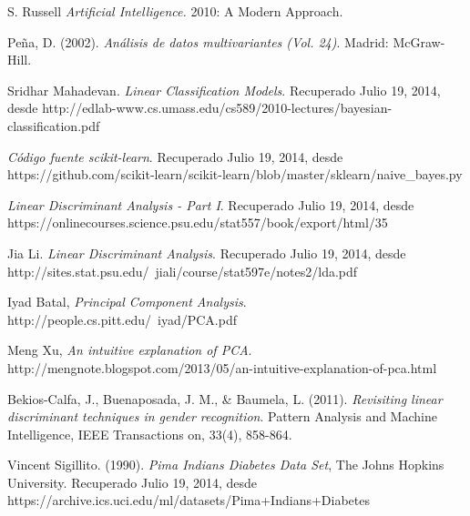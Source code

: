 \documentclass[letter, titlepage, 10pt]{article}
\begin{document}
\begin{thebibliography}{10} %
     S. Russell {\em Artificial Intelligence.} 2010: A Modern Approach.

     Peña, D. (2002). {\em Análisis de datos multivariantes (Vol. 24)}. Madrid: McGraw-Hill.

     Sridhar Mahadevan. {\em Linear Classification Models}. Recuperado Julio 19, 2014, desde http://edlab-www.cs.umass.edu/cs589/2010-lectures/bayesian-classification.pdf
    
     {\em Código fuente scikit-learn}. Recuperado Julio 19, 2014, desde https://github.com/scikit-learn/scikit-learn/blob/master/sklearn/naive\_bayes.py
    
     {\em Linear Discriminant Analysis - Part I}. Recuperado Julio 19, 2014, desde https://onlinecourses.science.psu.edu/stat557/book/export/html/35
    
     Jia Li. {\em  Linear Discriminant Analysis}. Recuperado Julio 19, 2014, desde http://sites.stat.psu.edu/~jiali/course/stat597e/notes2/lda.pdf
    
     Iyad Batal, {\em Principal Component Analysis}. http://people.cs.pitt.edu/~iyad/PCA.pdf

     Meng Xu, {\em An intuitive explanation of PCA}. http://mengnote.blogspot.com/2013/05/an-intuitive-explanation-of-pca.html

     Bekios-Calfa, J., Buenaposada, J. M., \& Baumela, L. (2011). {\em Revisiting linear discriminant techniques in gender recognition}. Pattern Analysis and Machine Intelligence, IEEE Transactions on, 33(4), 858-864.
    
     Vincent Sigillito. (1990). {\em Pima Indians Diabetes Data Set}, The Johns Hopkins University. Recuperado Julio 19, 2014, desde https://archive.ics.uci.edu/ml/datasets/Pima+Indians+Diabetes
\end{thebibliography}
\end{document}
